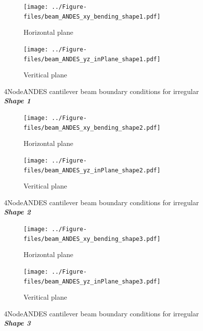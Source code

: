 \documentclass[fleqn,11pt]{article}
\begin{document}
\begin{figure}[H]
  \centering
    \begin{subfigure}{0.5\textwidth}
      \centering
      \texttt{[image: ../Figure-files/beam\_ANDES\_xy\_bending\_shape1.pdf]}
      \caption{Horizontal plane}
    \end{subfigure}
    \begin{subfigure}{0.5\textwidth}
      \centering
      \texttt{[image: ../Figure-files/beam\_ANDES\_yz\_inPlane\_shape1.pdf]}
      \caption{Veritical  plane}
    \end{subfigure}
      \captionsetup{justification=centering,margin=3cm}
  \caption{4NodeANDES cantilever beam boundary conditions for irregular \textbf{\emph{Shape 1}} }
  \label{fig irregular shape 1 4NodeANDES cantilever beams bc}
\end{figure}



\begin{figure}[H]
  \centering
    \begin{subfigure}{0.5\textwidth}
      \centering
      \texttt{[image: ../Figure-files/beam\_ANDES\_xy\_bending\_shape2.pdf]}
      \caption{Horizontal plane}
    \end{subfigure}
    \begin{subfigure}{0.5\textwidth}
      \centering
      \texttt{[image: ../Figure-files/beam\_ANDES\_yz\_inPlane\_shape2.pdf]}
      \caption{Veritical  plane}
    \end{subfigure}
      \captionsetup{justification=centering,margin=3cm}
  \caption{4NodeANDES cantilever beam boundary conditions for irregular \textbf{\emph{Shape 2}} }
  \label{fig irregular shape 2 4NodeANDES cantilever beams bc}
\end{figure}





\begin{figure}[H]
  \centering
    \begin{subfigure}{0.5\textwidth}
      \centering
      \texttt{[image: ../Figure-files/beam\_ANDES\_xy\_bending\_shape3.pdf]}
      \caption{Horizontal plane}
    \end{subfigure}
    \begin{subfigure}{0.5\textwidth}
      \centering
      \texttt{[image: ../Figure-files/beam\_ANDES\_yz\_inPlane\_shape3.pdf]}
      \caption{Veritical  plane}
    \end{subfigure}
      \captionsetup{justification=centering,margin=3cm}
  \caption{4NodeANDES cantilever beam boundary conditions for irregular \textbf{\emph{Shape 3}} }
  \label{fig irregular shape 3 4NodeANDES cantilever beams bc}
\end{figure}
\end{document}
